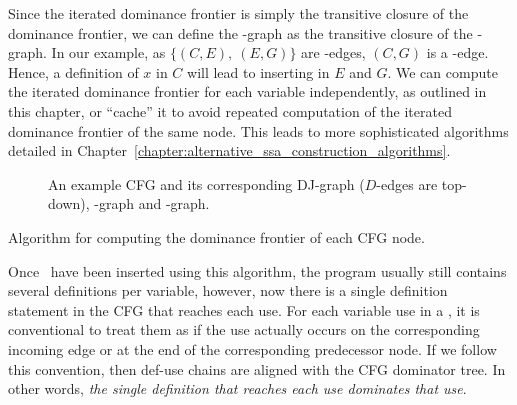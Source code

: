 {Since the iterated dominance frontier is simply the transitive closure of the dominance frontier, we can define the \iDF-graph as the transitive closure of the \DF-graph. 
In our example, as $\{(C,E),\ (E,G)\}$ are \DF-edges, $(C,G)$ is a \iDF-edge. 
Hence, a definition of $x$ in $C$ will lead to inserting \phifuns in $E$ and $G$. 
We can compute the iterated dominance frontier for each variable independently, as outlined in this chapter, or ``cache'' it to avoid repeated computation of the iterated dominance frontier of the same node. 
This leads to more sophisticated algorithms detailed in Chapter~\ref{chapter:alternative_ssa_construction_algorithms}.

\begin{figure}
\caption{\label{fig:classical_construction_algorithm:iDF}An example CFG and its 
corresponding DJ-graph ($D$-edges are top-down), \DF-graph and \iDF-graph.}
\end{figure}

\begin{algorithm}
 \caption{\label{alg:classical_construction:df}Algorithm for computing the dominance frontier of each CFG node.}
\end{algorithm}



Once \phifuns\ have been inserted using this algorithm, the program usually still contains several definitions per variable, however, now there is a single definition statement in the CFG that reaches each use. 
For each variable use in a \phifun, it is conventional to treat them as if the use actually occurs on the corresponding incoming edge or at the end of the corresponding predecessor node. 
If we follow this convention, then def-use chains are aligned with the CFG dominator tree. 
In other words, \emph{the single definition that reaches each use dominates that use}.

}
